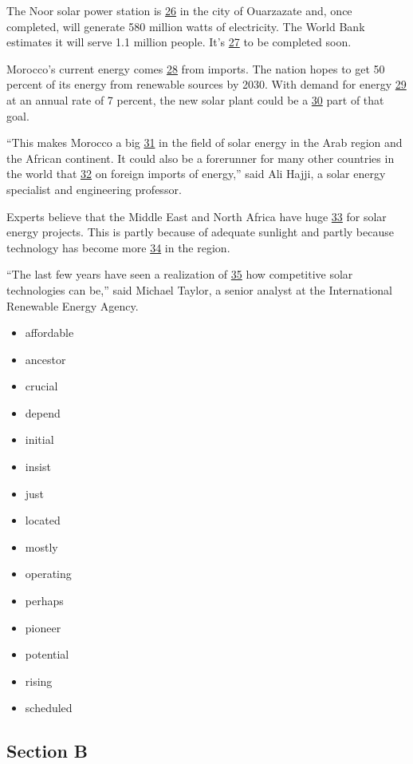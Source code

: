 \documentclass[UTF8,11pt]{ctexart}
\begin{document}
The Noor solar power station is \uline{26} in the city of Ouarzazate and, once completed, will generate 580 million watts of electricity. The World Bank estimates it will serve 1.1 million people. It’s \uline{27} to be completed soon.


Morocco’s current energy comes \uline{28} from imports. The nation hopes to get 50 percent of its energy from renewable sources by 2030. With demand for energy \uline{29} at an annual rate of 7 percent, the new solar plant could be a \uline{30} part of that goal.


“This makes Morocco a big \uline{31} in the field of solar energy in the Arab region and the African continent. It could also be a forerunner for many other countries in the world that \uline{32} on foreign imports of energy,” said Ali Hajji, a solar energy specialist and engineering professor.


Experts believe that the Middle East and North Africa have huge \uline{33} for solar energy projects. This is partly because of adequate sunlight and partly because technology has become more \uline{34} in the region.


“The last few years have seen a realization of \uline{35} how competitive solar technologies can be,” said Michael Taylor, a senior analyst at the International Renewable Energy Agency.


\begin{itemize}[leftmargin=2em,itemsep=.2em,topsep=.4em]\item[A.] affordable
\item[B.] ancestor
\item[C.] crucial
\item[D.] depend
\item[E.] initial
\item[F.] insist
\item[G.] just
\item[H.] located
\item[I.] mostly
\item[J.] operating
\item[K.] perhaps
\item[L.] pioneer
\item[M.] potential
\item[N.] rising
\item[O.] scheduled
\end{itemize}

\subsection*{\textbf{Section B}}
\end{document}

